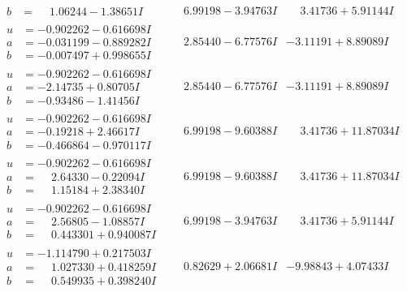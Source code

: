 \documentclass[1p]{elsarticle_modified}
\theoremstyle{definition}
\begin{document}
$$\begin{array}{c|c|c}
\begin{aligned}
b &= \phantom{-}1.06244 - 1.38651 I\end{aligned}
 & \phantom{-}6.99198 - 3.94763 I & \phantom{-}3.41736 + 5.91144 I \\ \hline\begin{aligned}
u &= -0.902262 - 0.616698 I \\
a &= -0.031199 - 0.889282 I \\
b &= -0.007497 + 0.998655 I\end{aligned}
 & \phantom{-}2.85440 - 6.77576 I & -3.11191 + 8.89089 I \\ \hline\begin{aligned}
u &= -0.902262 - 0.616698 I \\
a &= -2.14735 + 0.80705 I \\
b &= -0.93486 - 1.41456 I\end{aligned}
 & \phantom{-}2.85440 - 6.77576 I & -3.11191 + 8.89089 I \\ \hline\begin{aligned}
u &= -0.902262 - 0.616698 I \\
a &= -0.19218 + 2.46617 I \\
b &= -0.466864 - 0.970117 I\end{aligned}
 & \phantom{-}6.99198 - 9.60388 I & \phantom{-}3.41736 + 11.87034 I \\ \hline\begin{aligned}
u &= -0.902262 - 0.616698 I \\
a &= \phantom{-}2.64330 - 0.22094 I \\
b &= \phantom{-}1.15184 + 2.38340 I\end{aligned}
 & \phantom{-}6.99198 - 9.60388 I & \phantom{-}3.41736 + 11.87034 I \\ \hline\begin{aligned}
u &= -0.902262 - 0.616698 I \\
a &= \phantom{-}2.56805 - 1.08857 I \\
b &= \phantom{-}0.443301 + 0.940087 I\end{aligned}
 & \phantom{-}6.99198 - 3.94763 I & \phantom{-}3.41736 + 5.91144 I \\ \hline\begin{aligned}
u &= -1.114790 + 0.217503 I \\
a &= \phantom{-}1.027330 + 0.418259 I \\
b &= \phantom{-}0.549935 + 0.398240 I\end{aligned}
 & \phantom{-}0.82629 + 2.06681 I & -9.98843 + 4.07433 I \\ \hline\begin{aligned}

\end{aligned}
\end{array}$$
\end{document}
